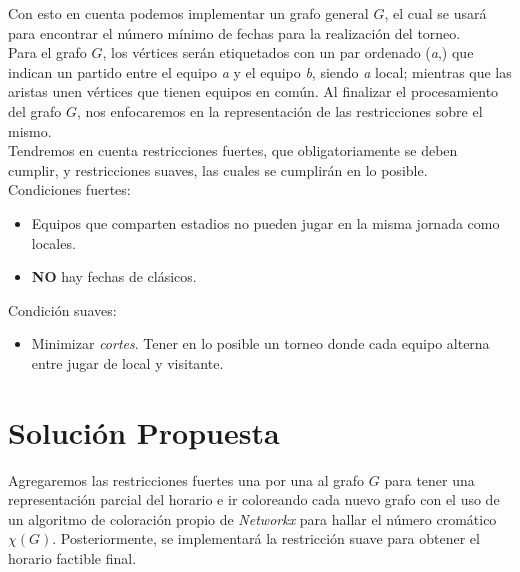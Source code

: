 \documentclass[11pt]{article}
\begin{document}
\begin{multicols}{2}
            Con esto en cuenta podemos implementar un grafo general $G$, el cual se usará para 
            encontrar el número mínimo de fechas para la realización del torneo.\\
            Para el grafo $G$, los vértices serán etiquetados con un par ordenado (\textit{a},) que indican un 
            partido entre el equipo \textit{a} y el equipo \textit{b}, siendo \textit{a} local; mientras que las aristas unen 
            vértices que tienen equipos en común. Al finalizar el procesamiento del grafo $G$, nos enfocaremos en la representación de las restricciones
            sobre el mismo.\\[10pt]
            Tendremos en cuenta restricciones fuertes, que obligatoriamente se deben cumplir, y restricciones 
            suaves, las cuales se cumplirán en lo posible.\\[10pt]
            Condiciones fuertes:
            \begin{itemize}
                \item Equipos que comparten estadios no pueden jugar en la misma jornada como locales.
                \item \textbf{NO} hay fechas de clásicos.
            \end{itemize}
            Condición suaves:
            \begin{itemize}  
                \item Minimizar \textit{cortes}. Tener en lo posible un torneo donde cada equipo alterna entre jugar de local y visitante.     
            \end{itemize}

        \section{Solución Propuesta}
            Agregaremos las restricciones fuertes una por una al grafo $G$ para tener una representación parcial del horario e ir coloreando cada nuevo grafo con el uso de un algoritmo de coloración propio de \textit{Networkx} 
            para hallar el número cromático $\chi(G)$. Posteriormente, se implementará la restricción suave para obtener el horario factible final. 
        

\end{multicols}
\end{document}
